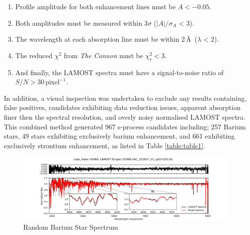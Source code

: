 \documentclass[a4paper,fleqn,usenatbib]{mnras}
\begin{document}
\begin{enumerate} 
\item Profile amplitude for both enhancement lines must be $A < -0.05$.
\item Both amplitudes must be measured within 3$\sigma$ ($|A|/\sigma _A$ < 3).
\item The wavelength at each absorption line must be within 2\,\AA\ ($\lambda$ < 2).
\item The reduced $\chi^2$ from \emph{The Cannon} must be $\chi_r^2 < 3$.
\item And finally, the LAMOST spectra must have a signal-to-noise ratio of $S/N > 30\,\textrm{pixel}^{-1}$.
\end{enumerate}
In addition, a visual inspection was undertaken to exclude any results containing, false positives, candidates exhibiting data reduction issues, apparent absorption finer then the spectral resolution, and overly noisy normalised LAMOST spectra. This combined method generated 967 s-process candidates including; 257 Barium stars, 49 stars exhibiting exclusively barium enhancement, and 661 exhibiting exclusively strontium enhancement, as listed in Table \ref{table:table1}. 

\begin{figure}
	\includegraphics[width=\columnwidth]{posterchild.png}
    \caption{Random Barium Star Spectrum}
    \label{fig:figure1}
\end{figure}
\end{document}
